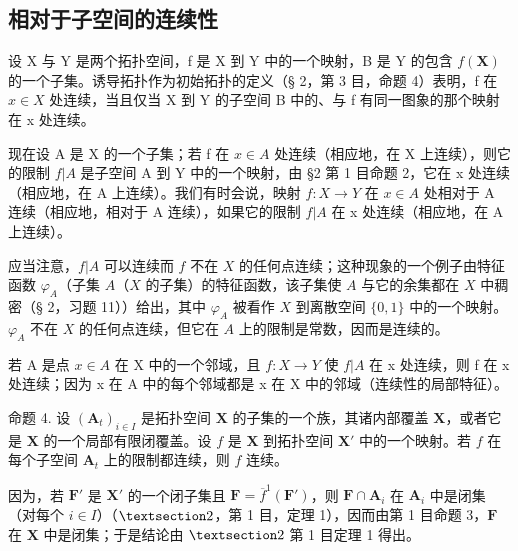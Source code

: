 \subsection{相对于子空间的连续性}

设 X 与 Y 是两个拓扑空间，f 是 X 到 Y 中的一个映射，B 是 Y 的包含 \(f(\mathbf{X})\) 的一个子集。诱导拓扑作为初始拓扑的定义（§ 2，第 3 目，命题 4）表明，f 在 \(x \in X\) 处连续，当且仅当 X 到 Y 的子空间 B 中的、与 f 有同一图象的那个映射在 x 处连续。

现在设 A 是 X 的一个子集；若 f 在 \(x \in A\) 处连续（相应地，在 X 上连续），则它的限制 \(f|A\) 是子空间 A 到 Y 中的一个映射，由 §2 第 1 目命题 2，它在 x 处连续（相应地，在 A 上连续）。我们有时会说，映射 \(f: X \to Y\) 在 \(x \in A\) 处相对于 A 连续（相应地，相对于 A 连续），如果它的限制 \(f|A\) 在 x 处连续（相应地，在 A 上连续）。

应当注意，\(f|A\) 可以连续而 \(f\) 不在 \(X\) 的任何点连续；这种现象的一个例子由特征函数 \(\varphi_A\)（子集 \(A\)（\(X\) 的子集）的特征函数，该子集使 \(A\) 与它的余集都在 \(X\) 中稠密（§ 2，习题 11））给出，其中 \(\varphi_A\) 被看作 \(X\) 到离散空间 \(\{0, 1\}\) 中的一个映射。\(\varphi_A\) 不在 \(X\) 的任何点连续，但它在 \(A\) 上的限制是常数，因而是连续的。

若 A 是点 \(x \in A\) 在 X 中的一个邻域，且 \(f: X \to Y\) 使 \(f|A\) 在 x 处连续，则 f 在 x 处连续；因为 x 在 A 中的每个邻域都是 x 在 X 中的邻域（连续性的局部特征）。

命题 4. 设 \((\mathbf{A}_t)_{i\in I}\) 是拓扑空间 \(\mathbf{X}\) 的子集的一个族，其诸内部覆盖 \(\mathbf{X}\)，或者它是 \(\mathbf{X}\) 的一个局部有限闭覆盖。设 \(f\) 是 \(\mathbf{X}\) 到拓扑空间 \(\mathbf{X}'\) 中的一个映射。若 \(f\) 在每个子空间 \(\mathbf{A}_t\) 上的限制都连续，则 \(f\) 连续。

因为，若 \(\mathbf{F}'\) 是 \(\mathbf{X}'\) 的一个闭子集且 \(\mathbf{F} = \overline{f}^{1} (\mathbf{F}')\)，则 \(\mathbf{F} \cap \mathbf{A}_i\) 在 \(\mathbf{A}_i\) 中是闭集（对每个 \(i \in I\)）（\(\S 2\)，第 1 目，定理 1），因而由第 1 目命题 3，\(\mathbf{F}\) 在 \(\mathbf{X}\) 中是闭集；于是结论由 \(\S 2\) 第 1 目定理 1 得出。

